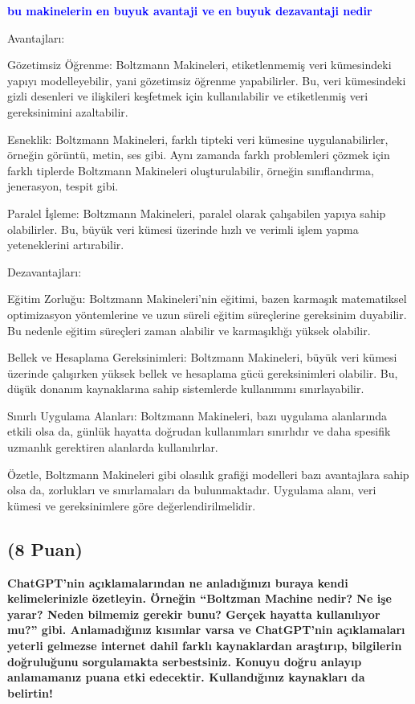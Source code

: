 \documentclass[11pt]{article}
\begin{document}
\textbf{\textcolor{blue}{bu makinelerin en buyuk avantaji ve en buyuk dezavantaji nedir}}

Avantajları:

Gözetimsiz Öğrenme: Boltzmann Makineleri, etiketlenmemiş veri kümesindeki yapıyı modelleyebilir, yani gözetimsiz öğrenme yapabilirler. Bu, veri kümesindeki gizli desenleri ve ilişkileri keşfetmek için kullanılabilir ve etiketlenmiş veri gereksinimini azaltabilir.

Esneklik: Boltzmann Makineleri, farklı tipteki veri kümesine uygulanabilirler, örneğin görüntü, metin, ses gibi. Aynı zamanda farklı problemleri çözmek için farklı tiplerde Boltzmann Makineleri oluşturulabilir, örneğin sınıflandırma, jenerasyon, tespit gibi.

Paralel İşleme: Boltzmann Makineleri, paralel olarak çalışabilen yapıya sahip olabilirler. Bu, büyük veri kümesi üzerinde hızlı ve verimli işlem yapma yeteneklerini artırabilir.

Dezavantajları:

Eğitim Zorluğu: Boltzmann Makineleri'nin eğitimi, bazen karmaşık matematiksel optimizasyon yöntemlerine ve uzun süreli eğitim süreçlerine gereksinim duyabilir. Bu nedenle eğitim süreçleri zaman alabilir ve karmaşıklığı yüksek olabilir.

Bellek ve Hesaplama Gereksinimleri: Boltzmann Makineleri, büyük veri kümesi üzerinde çalışırken yüksek bellek ve hesaplama gücü gereksinimleri olabilir. Bu, düşük donanım kaynaklarına sahip sistemlerde kullanımını sınırlayabilir.

Sınırlı Uygulama Alanları: Boltzmann Makineleri, bazı uygulama alanlarında etkili olsa da, günlük hayatta doğrudan kullanımları sınırlıdır ve daha spesifik uzmanlık gerektiren alanlarda kullanılırlar.

Özetle, Boltzmann Makineleri gibi olasılık grafiği modelleri bazı avantajlara sahip olsa da, zorlukları ve sınırlamaları da bulunmaktadır. Uygulama alanı, veri kümesi ve gereksinimlere göre değerlendirilmelidir.

\subsection{(8 Puan)} \textbf{ChatGPT’nin açıklamalarından ne anladığınızı buraya kendi kelimelerinizle özetleyin. Örneğin ``Boltzman Machine nedir? Ne işe yarar? Neden bilmemiz gerekir bunu? Gerçek hayatta kullanılıyor mu?'' gibi. Anlamadığınız kısımlar varsa ve ChatGPT’nin açıklamaları yeterli gelmezse internet dahil farklı kaynaklardan araştırıp, bilgilerin doğruluğunu sorgulamakta serbestsiniz. Konuyu doğru anlayıp anlamamanız puana etki edecektir. Kullandığınız kaynakları da belirtin!}
\end{document}
